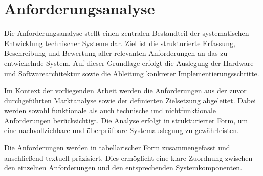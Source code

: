 \chapter{Anforderungsanalyse}
Die Anforderungsanalyse stellt einen zentralen Bestandteil der systematischen Entwicklung technischer Systeme dar.
Ziel ist die strukturierte Erfassung, Beschreibung und Bewertung aller relevanten Anforderungen an das zu entwickelnde System.
Auf dieser Grundlage erfolgt die Auslegung der Hardware- und Softwarearchitektur sowie die Ableitung konkreter Implementierungsschritte.

Im Kontext der vorliegenden Arbeit werden die Anforderungen aus der zuvor durchgeführten Marktanalyse sowie der definierten Zielsetzung abgeleitet.
Dabei werden sowohl funktionale als auch technische und nichtfunktionale Anforderungen berücksichtigt.
Die Analyse erfolgt in strukturierter Form, um eine nachvollziehbare und überprüfbare Systemauslegung zu gewährleisten.

Die Anforderungen werden in tabellarischer Form zusammengefasst und anschließend textuell präzisiert.
Dies ermöglicht eine klare Zuordnung zwischen den einzelnen Anforderungen und den entsprechenden Systemkomponenten.
